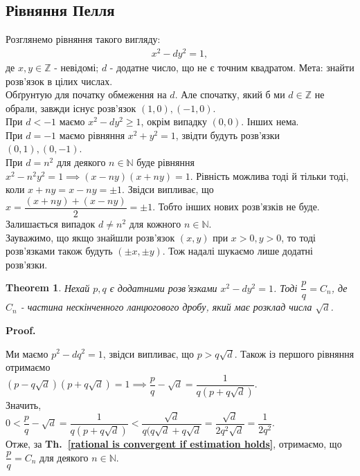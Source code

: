 \documentclass[a4paper, 14pt]{extarticle}
\makeatletter
\theoremstyle{theoremdd}
\newtheorem{theorem}{Theorem}[subsection]
\theoremstyle{theoremdd}
\theoremstyle{theoremdd}
\theoremstyle{theoremdd}
\theoremstyle{theoremdd}
\theoremstyle{theoremdd}
\theoremstyle{theoremdd}
\theoremstyle{theoremdd}
\def\qed{$\blacksquare$}
\renewenvironment{proof}[1][Proof.\\]{\par
\pushQED{\hfill \qed}%
\normalfont \topsep6\p@\@plus6\p@\relax
\trivlist
\item\relax
{\bfseries
#1\@addpunct{.}}\hspace\labelsep\ignorespaces
}{%
\popQED\endtrivlist\@endpefalse
}
\newcommand\thref[1]{\textbf{Th.~\ref{#1}}}
\makeatother
\begin{document}
\subsection{Рівняння Пелля}
Розглянемо рівняння такого вигляду:
\begin{align*}
x^2 - dy^2 = 1,
\end{align*}
де $x,y \in \mathbb{Z}$ - невідомі; $d$ - додатне число, що не є точним квадратом. Мета: знайти розв'язок в цілих числах.
\bigskip \\
Обґрунтую для початку обмеження на $d$. Але спочатку, який б ми $d \in \mathbb{Z}$ не обрали, завжди існує розв'язок $(1,0), (-1,0)$.\\
При $d < -1$ маємо $x^2 -dy^2 \geq 1$, окрім випадку $(0,0)$. Інших нема.\\
При $d = -1$ маємо рівняння $x^2 + y^2 = 1$, звідти будуть розв'язки $(0,1), (0,-1)$.\\
При $d = n^2$ для деякого $n \in \mathbb{N}$ буде рівняння $x^2 - n^2y^2 = 1 \implies (x-ny)(x+ny) = 1$. Рівність можлива тоді й тільки тоді, коли $x + ny = x - ny = \pm 1$. Звідси випливає, що $x = \dfrac{(x+ny)+(x-ny)}{2} = \pm 1$. Тобто інших нових розв'язків не буде.\\
Залишається випадок $d \neq n^2$ для кожного $n \in \mathbb{N}$.
\bigskip \\
Зауважимо, що якщо знайшли розв'язок $(x,y)$ при $x > 0, y > 0$, то тоді розв'язками також будуть $(\pm x, \pm y)$. Тож надалі шукаємо лише додатні розв'язки.

\begin{theorem}
Нехай $p,q$ є додатними розв'язками $x^2-dy^2 = 1$. Тоді $\dfrac{p}{q} = C_n$, де $C_n$ - частина нескінченного ланцюгового дробу, який має розклад числа $\sqrt{d}$.
\end{theorem}

\begin{proof}
Ми маємо $p^2 - dq^2 = 1$, звідси випливає, що $p > q \sqrt{d}$. Також із першого рівняння отримаємо\\ $(p-q \sqrt{d}) (p+q \sqrt{d}) = 1 \iffalse \implies p-q \sqrt{d} = \dfrac{1}{p + q\sqrt{d}} \fi \implies \dfrac{p}{q} - \sqrt{d} = \dfrac{1}{q(p+q\sqrt{d})}$.\\
Значить, \\
$0 < \dfrac{p}{q} - \sqrt{d} = \dfrac{1}{q(p + q \sqrt{d})} < \dfrac{\sqrt{d}}{q(q\sqrt{d} + q\sqrt{d}} = \dfrac{\sqrt{d}}{2q^2 \sqrt{d}} = \dfrac{1}{2q^2}$.\\
Отже, за \thref{rational is convergent if estimation holds}, отримаємо, що $\dfrac{p}{q} = C_n$ для деякого $n \in \mathbb{N}$.
\end{proof}
\end{document}
